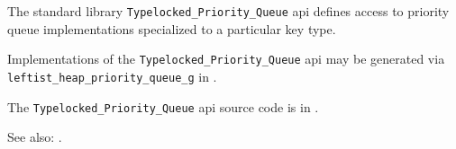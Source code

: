 
The standard library {\tt Typelocked\_Priority\_Queue} api defines access to priority queue 
implementations specialized to a particular key type.

Implementations of the {\tt Typelocked\_Priority\_Queue} api may be generated via 
{\tt leftist\_heap\_priority\_queue\_g} in .

The {\tt Typelocked\_Priority\_Queue} api source code is in .

See also:  .






